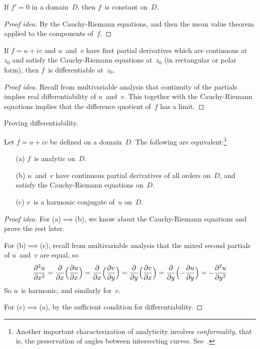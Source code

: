 \begin{cor}
If \(f'=0\) in a domain~\(D\), then \(f\)~is constant on~\(D\).
\end{cor}
\begin{proof}[Proof idea]
By the Cauchy-Riemann equations, and then the mean value theorem applied to the components of~\(f\).
\end{proof}

\begin{thm}
If \(f=u+iv\) and \(u\)~and~\(v\) have first partial derivatives which are continuous at~\(z_0\) and satisfy the Cauchy-Riemann equations at~\(z_0\) (in rectangular or polar form), then \(f\)~is differentiable at~\(z_0\).
\end{thm}
\begin{proof}[Proof idea]
Recall from multivariable analysis that continuity of the partials implies real differentiability of \(u\)~and~\(v\). This together with the Cauchy-Riemann equations implies that the difference quotient of~\(f\) has a limit.
\end{proof}
\begin{app}
Proving differentiability.
\end{app}

\begin{thm}
Let \(f=u+iv\) be defined on a domain~\(D\). The following are equivalent:\footnote{Another important characterization of analyticity involves \emph{conformality}, that is, the preservation of angles between intersecting curves. See~\cite[\S II.11--12]{sarason94}.}
\begin{enumerate}[itemsep=0pt]
\item[(a)] \(f\)~is analytic on~\(D\).
\item[(b)] \(u\)~and~\(v\) have continuous partial derivatives of all orders on~\(D\), and satisfy the Cauchy-Riemann equations on~\(D\).
\item[(c)] \(v\)~is a harmonic conjugate of~\(u\) on~\(D\).
\end{enumerate}
\end{thm}
\begin{proof}[Proof idea]
For (a)\(\implies\)(b), we know about the Cauchy-Riemann equations and prove the rest later.

For (b)\(\implies\)(c), recall from multivariable analysis that the mixed second partials of \(u\)~and~\(v\) are equal, so
\[\frac{\partial^2u}{\partial x^2}=\frac{\partial}{\partial x}\Bigl(\frac{\partial u}{\partial x}\Bigr)=\frac{\partial}{\partial x}\Bigl(\frac{\partial v}{\partial y}\Bigr)=\frac{\partial}{\partial y}\Bigl(\frac{\partial v}{\partial x}\Bigr)=\frac{\partial}{\partial y}\Bigl(-\frac{\partial u}{\partial y}\Bigr)=-\frac{\partial^2 u}{\partial y^2}\]
So \(u\)~is harmonic, and similarly for~\(v\).

For (c)\(\implies\)(a), by the sufficient condition for differentiability.
\end{proof}

